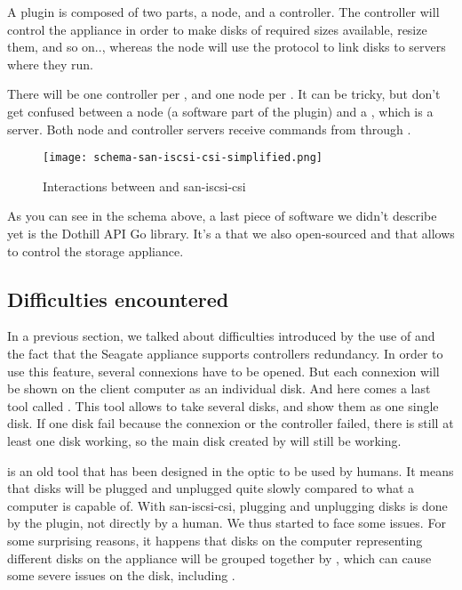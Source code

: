 A  plugin is composed of two parts, a node, and a controller. The controller will control the appliance in order to make disks of required sizes available, resize them, and so on.., whereas the node will use the  protocol to link disks to servers where they run.

There will be one controller per , and one node per  . It can be tricky, but don't get confused between a  node (a software part of the plugin) and a  , which is a server. Both node and controller servers receive  commands from  through .

\begin{figure}[h]
    \centering
    \texttt{[image: schema-san-iscsi-csi-simplified.png]}
    \caption{Interactions between  and \gls{san-iscsi-csi}}
    \label{fig:k8s-san-scsi-csi}
\end{figure}

As you can see in the schema above, a last piece of software we didn't describe yet is the Dothill API Go library. It's a  that we also open-sourced and that allows to control the storage appliance.

\subsection{Difficulties encountered}

In a previous section, we talked about difficulties introduced by the use of  and the fact that the Seagate appliance supports controllers redundancy. In order to use this feature, several  connexions have to be opened. But each connexion will be shown on the client computer as an individual disk. And here comes a last tool called . This tool allows to take several disks, and show them as one single disk. If one disk fail because the connexion or the controller failed, there is still at least one disk working, so the main disk created by  will still be working.

 is an old tool that has been designed in the optic to be used by humans. It means that disks will be plugged and unplugged quite slowly compared to what a computer is capable of. With \gls{san-iscsi-csi}, plugging and unplugging disks is done by the plugin, not directly by a human. We thus started to face some  issues. For some surprising reasons, it happens that disks on the computer representing different disks on the appliance will be grouped together by , which can cause some severe issues on the disk, including .

